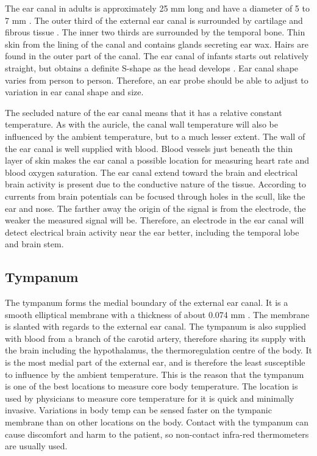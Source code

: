 The ear canal in adults is approximately 25 mm long and have a diameter of 5 to 7 mm \citep{alvord1997anatomy}. The outer third of the external ear canal is surrounded by cartilage and fibrous tissue \citep{ExternalAuditoryCanal}. The inner two thirds are surrounded by the temporal bone. Thin skin from the lining of the canal and contains glands secreting ear wax. Hairs are found in the outer part of the canal. The ear canal of infants starts out relatively straight, but obtains a definite S-shape as the head develops \citep{alvord1997anatomy}. Ear canal shape varies from person to person. Therefore, an ear probe should be able to adjust to variation in ear canal shape and size.

The secluded nature of the ear canal means that it has a relative constant temperature. As with the auricle, the canal wall temperature will also be influenced by the ambient temperature, but to a much lesser extent. The wall of the ear canal is well supplied with blood. Blood vessels just beneath the thin layer of skin makes the ear canal a possible location for measuring heart rate and blood oxygen saturation. The ear canal extend toward the brain and electrical brain activity is present due to the conductive nature of the tissue. According to \cite{nunez2006electric} currents from brain potentials can be focused through holes in the scull, like the ear and nose. The farther away the origin of the signal is from the electrode, the weaker the measured signal will be. Therefore, an electrode in the ear canal will detect electrical brain activity near the ear better, including the temporal lobe and brain stem.

\subsection{Tympanum}
The tympanum forms the medial boundary of the external ear canal. It is a smooth elliptical membrane with a thickness of about 0.074 mm \citep{alvord1997anatomy}. The membrane is slanted with regards to the external ear canal. The tympanum is also supplied with blood from a branch of the carotid artery, therefore sharing its supply with the brain including the hypothalamus, the thermoregulation centre of the body. It is the most medial part of the external ear, and is therefore the least susceptible to influence by the ambient temperature. This is the reason that the tympanum is one of the best locations to measure core body temperature. The location is used by physicians to measure core temperature for it is quick and minimally invasive. Variations in body temp can be sensed faster on the tympanic membrane than on other locations on the body.  Contact with the tympanum can cause discomfort and harm to the patient, so non-contact infra-red thermometers are usually used.


